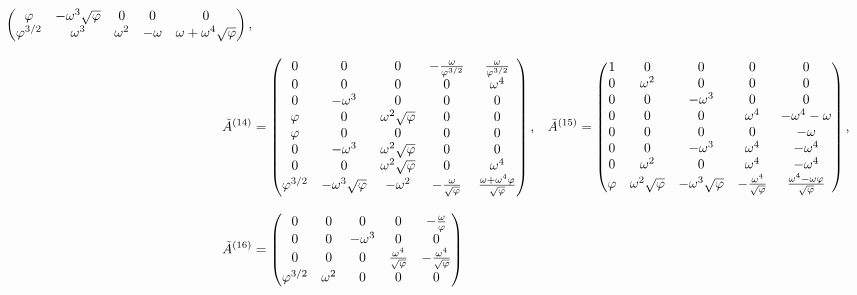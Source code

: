 \begin{align}
\begin{pmatrix}
    \varphi & -\omega^3\sqrt{\varphi} & 0 & 0 & 0 \\
    \varphi^{3/2} & \omega^3 & \omega^2 & -\omega & \omega+\omega^4 \sqrt{\varphi} \\
  \end{pmatrix}, \notag \\[2ex]
  \tilde{A}^{(14)} &= \begin{pmatrix}
    0 & 0 & 0 & -\frac{\omega}{\varphi^{3/2}} & \frac{\omega}{\varphi^{3/2}} \\
    0 & 0 & 0 & 0 & \omega^4 \\
    0 & -\omega^3 & 0 & 0 & 0 \\
    \varphi & 0 & \omega^2 \sqrt{\varphi} & 0 & 0 \\
    \varphi & 0 & 0 & 0 & 0 \\
    0 & -\omega^3 & \omega^2 \sqrt{\varphi} & 0 & 0 \\
    0 & 0 & \omega^2 \sqrt{\varphi} & 0 & \omega^4 \\
    \varphi^{3/2} & -\omega^3\sqrt{\varphi} & -\omega^2 & -\frac{\omega}{\sqrt{\varphi}} & \frac{\omega+\omega^4 \varphi}{\sqrt{\varphi}} \\
  \end{pmatrix}, &
  \tilde{A}^{(15)} &= \begin{pmatrix}
    1 & 0 & 0 & 0 & 0 \\
    0 & \omega^2 & 0 & 0 & 0 \\
    0 & 0 & -\omega^3 & 0 & 0 \\
    0 & 0 & 0 & \omega^4 & -\omega^4-\omega \\
    0 & 0 & 0 & 0 & -\omega \\
    0 & 0 & -\omega^3 & \omega^4 & -\omega^4 \\
    0 & \omega^2 & 0 & \omega^4 & -\omega^4 \\
    \varphi & \omega^2 \sqrt{\varphi} & -\omega^3\sqrt{\varphi} & -\frac{\omega^4}{\sqrt{\varphi}} & \frac{\omega^4-\omega \varphi}{\sqrt{\varphi}} \\
  \end{pmatrix}, \notag \\[2ex]
  \tilde{A}^{(16)} &= \begin{pmatrix}
    0 & 0 & 0 & 0 & -\frac{\omega}{\varphi} \\
    0 & 0 & -\omega^3 & 0 & 0 \\
    0 & 0 & 0 & \frac{\omega^4}{\sqrt{\varphi}} & -\frac{\omega^4}{\sqrt{\varphi}} \\
    \varphi^{3/2} & \omega^2 & 0 & 0 & 0 \\

\end{pmatrix}
\end{align}
